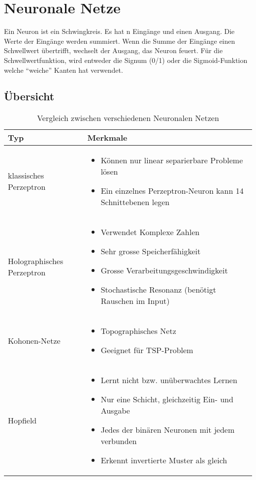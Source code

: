 \section{Neuronale Netze}
Ein Neuron ist ein Schwingkreis. Es hat n Eingänge und einen Ausgang. Die Werte der
Eingänge werden summiert. Wenn die Summe der Eingänge einen Schwellwert übertrifft, wechselt der Ausgang, das Neuron feuert.
Für die Schwellwertfunktion, wird entweder die Signum (0/1) oder die Sigmoid-Funktion welche ``weiche'' Kanten hat verwendet.
\subsection{Übersicht}
\begin{table}[htbp]
	\begin{tabular}{l | p{8cm}}
		Typ & Merkmale \\
		\hline
		{klassisches Perzeptron} & {
			\begin{itemize}
				\item Können nur linear separierbare Probleme lösen
				\item Ein einzelnes Perzeptron-Neuron kann 14 Schnittebenen legen
			\end{itemize}
		}
		\\
		{Holographisches Perzeptron} & {
			\begin{itemize}
				\item Verwendet Komplexe Zahlen
				\item Sehr grosse Speicherfähigkeit
				\item Grosse Verarbeitungsgeschwindigkeit
				\item Stochastische Resonanz (benötigt Rauschen im Input)
			\end{itemize}
		}
		\\
		{Kohonen-Netze} & {
			\begin{itemize}
				\item Topographisches Netz
				\item Geeignet für TSP-Problem
			\end{itemize}
		}
		\\
		{Hopfield} & {
			\begin{itemize}
				\item Lernt nicht bzw. unüberwachtes Lernen
				\item Nur eine Schicht, gleichzeitig Ein- und Ausgabe
				\item Jedes der binären Neuronen mit jedem verbunden
				\item Erkennt invertierte Muster als gleich
			\end{itemize}
		}
	\end{tabular}
	\caption{Vergleich zwischen verschiedenen Neuronalen Netzen}
	\label{tab:nnetze}
\end{table}
